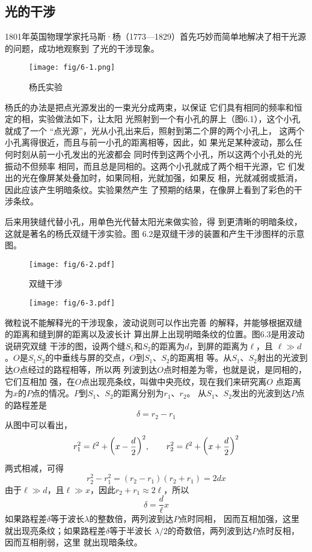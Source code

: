 \subsection{光的干涉}

1801年英国物理学家托马斯·杨（1773—1829）首先巧妙而简单地解决了相干光源的问题，成功地观察到
了光的干涉现象。
\begin{figure}[htp]\centering
    \texttt{[image: fig/6-1.png]}
    \caption{杨氏实验}
    \end{figure}

杨氏的办法是把点光源发出的一束光分成两束，以保证
它们具有相同的频率和恒定的相，实验做法如下，让太阳
光照射到一个有小孔的屏上（图6.1），这个小孔就成了一个
“点光源”，光从小孔出来后，照射到第二个屏的两个小孔上，
这两个小孔离得很近，而且与前一小孔的距离相等，因此，如
果光足某种波动，那么任何时刻从前一小孔发出的光波都会
同时传到这两个小孔，所以这两个小孔处的光振动不但频率
相同，而且总是同相的。这两个小孔就成了两个相干光源，它
们发出的光在像屏某处叠加时，如果同相，光就加强，如果反
相，光就减弱或抵消，因此应该产生明暗条纹。实验果然产生
了预期的结果，在像屏上看到了彩色的干涉条纹。

后来用狭缝代替小孔，用单色光代替太阳光来做实验，得
到更清晰的明暗条纹，这就是著名的杨氏双缝干涉实验。图
6.2是双缝干涉的装置和产生干涉图样的示意图。
\begin{figure}[htp]\centering
    \texttt{[image: fig/6-2.pdf]}
    \caption{双缝干涉}
    \end{figure}

    \begin{figure}[htp]\centering
\texttt{[image: fig/6-3.pdf]}
\caption{}
\end{figure}
微粒说不能解释光的干涉现象，波动说则可以作出完善
的解释，并能够根据双缝的距离和缝到屏的距离以及波长计
算出屏上出现明暗条纹的位置。图6.3是用波动说研究双缝
干涉的图，设两个缝$S_1$和$S_2$的距离为$d$，到屏的距离为$\ell$，且
$\ell\gg d$。$O$是$S_1S_2$的中垂线与屏的交点，$O$到$S_1$、$S_2$的距离相
等。从$S_1$、$S_2$射出的光波到达$O$点经过的路程相等，所以两
列波到达$O$点时相差为零，也就是说，是同相的，它们互相加
强，在$O$点出现亮条纹，叫做中央亮纹，现在我们来研究离$O$
点距离为$x$的$P$点的情况。$P$到$S_1$、$S_2$的距离分别为$r_1$、$r_2$。
从$S_1$、$S_2$发出的光波到达$P$点的路程差是
\[\delta =r_2-r_1 \]
从图中可以看出，
\[r^2_1=\ell^2+\qty(x-\frac{d}{2})^2,\qquad r^2_2=\ell^2+\qty(x+\frac{d}{2})^2  \]
两式相减，可得
\[r^2_2-r^2_1=(r_2-r_1)(r_2+r_1)=2dx\]
由于$\ell\gg d$，且$\ell\gg x$，因此$r_2+r_1\approx 2\ell$，所以
\[\delta=\frac{d}{\ell}x \]
如果路程差$\delta$等于波长$\lambda$的整数倍，两列波到达$P$点时同相，
因而互相加强，这里就出现亮条纹；如果路程差$\delta$等于半波长
$\lambda/2$的奇数倍，两列波到达$P$点时反相，因而互相削弱，这里
就出现暗条纹。

